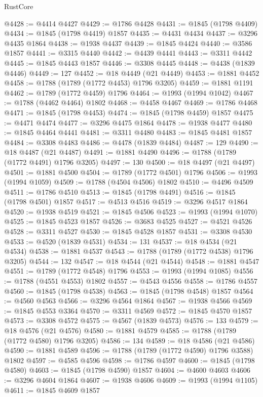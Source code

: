 \begin{lexlean}{RustCore}
\begin{coremodule}
@4428 := @4414 @4427
@4429 := @1786 @4428
@4431 := @1845 (@1798 @4409)
@4434 := @1845 (@1798 @4419) @1857
@4435 := @4431 @4434
@4437 := @3296 @4435 @1864
@4438 := @1938 @4437
@4439 := @1845 @4424
@4440 := @3586 @1857
@4441 := @3315 @4440
@4442 := @4439 @4441
@4443 := @3311 @4442
@4445 := @1845 @4443 @1857
@4446 := @3308 @4445
@4448 := @4438 (@1839 @4446)
@4449 := 127
@4452 := @18 @4449 (@21 @4449)
@4453 := @1881 @4452
@4458 := @1788 (@1789 (@1772 @4453) @1796 @3205)
@4459 := @1881 @1191
@4462 := @1789 (@1772 @4459) @1796
@4464 := @1993 (@1994 @1042)
@4467 := @1788 (@4462 @4464) @1802
@4468 := @4458 @4467
@4469 := @1786 @4468
@4471 := @1845 (@1798 @4453)
@4474 := @1845 (@1798 @4459) @1857
@4475 := @4471 @4474
@4477 := @3296 @4475 @1864
@4478 := @1938 @4477
@4480 := @1845 @4464 @4441
@4481 := @3311 @4480
@4483 := @1845 @4481 @1857
@4484 := @3308 @4483
@4486 := @4478 (@1839 @4484)
@4487 := 129
@4490 := @18 @4487 (@21 @4487)
@4491 := @1881 @4490
@4496 := @1788 (@1789 (@1772 @4491) @1796 @3205)
@4497 := 130
@4500 := @18 @4497 (@21 @4497)
@4501 := @1881 @4500
@4504 := @1789 (@1772 @4501) @1796
@4506 := @1993 (@1994 @1059)
@4509 := @1788 (@4504 @4506) @1802
@4510 := @4496 @4509
@4511 := @1786 @4510
@4513 := @1845 (@1798 @4491)
@4516 := @1845 (@1798 @4501) @1857
@4517 := @4513 @4516
@4519 := @3296 @4517 @1864
@4520 := @1938 @4519
@4521 := @1845 @4506
@4523 := @1993 (@1994 @1070)
@4525 := @1845 @4523 @1857
@4526 := @3683 @4525
@4527 := @4521 @4526
@4528 := @3311 @4527
@4530 := @1845 @4528 @1857
@4531 := @3308 @4530
@4533 := @4520 (@1839 @4531)
@4534 := 131
@4537 := @18 @4534 (@21 @4534)
@4538 := @1881 @4537
@4543 := @1788 (@1789 (@1772 @4538) @1796 @3205)
@4544 := 132
@4547 := @18 @4544 (@21 @4544)
@4548 := @1881 @4547
@4551 := @1789 (@1772 @4548) @1796
@4553 := @1993 (@1994 @1085)
@4556 := @1788 (@4551 @4553) @1802
@4557 := @4543 @4556
@4558 := @1786 @4557
@4560 := @1845 (@1798 @4538)
@4563 := @1845 (@1798 @4548) @1857
@4564 := @4560 @4563
@4566 := @3296 @4564 @1864
@4567 := @1938 @4566
@4569 := @1845 @4553 @3364
@4570 := @3311 @4569
@4572 := @1845 @4570 @1857
@4573 := @3308 @4572
@4575 := @4567 (@1839 @4573)
@4576 := 133
@4579 := @18 @4576 (@21 @4576)
@4580 := @1881 @4579
@4585 := @1788 (@1789 (@1772 @4580) @1796 @3205)
@4586 := 134
@4589 := @18 @4586 (@21 @4586)
@4590 := @1881 @4589
@4596 := @1788 (@1789 (@1772 @4590) @1796 @3588) @1802
@4597 := @4585 @4596
@4598 := @1786 @4597
@4600 := @1845 (@1798 @4580)
@4603 := @1845 (@1798 @4590) @1857
@4604 := @4600 @4603
@4606 := @3296 @4604 @1864
@4607 := @1938 @4606
@4609 := @1993 (@1994 @1105)
@4611 := @1845 @4609 @1857

\end{coremodule}
\end{lexlean}
